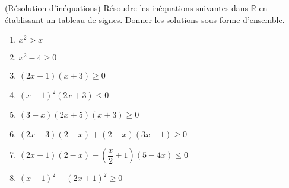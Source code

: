 \documentclass[12pt,
addpoints,
answers,
fleqn
]{exam}
\begin{document}
\begin{questions}
\begin{solution}
\begin{parts}
            \part $\dfrac{4\sqrt{8}x+1}{5}> \dfrac{3\sqrt{2}}{4}x \iff \dfrac{4\sqrt{8}x}{5} - \dfrac{3\sqrt{2}x}{4} > \dfrac{-1}{5} \iff \left(\dfrac{4\times 2\sqrt{2}}{5}-\dfrac{3\sqrt{2}}{4}\right)x > \dfrac{-1}{5} \iff \left(\dfrac{32\sqrt{2}}{20}-\dfrac{15\sqrt{2}}{20}\right)x > \dfrac{-1}{5} \iff \dfrac{17\sqrt{2}}{20}x > -\dfrac{1}{5} \iff x > \dfrac{-1}{5}\times\dfrac{20}{17\sqrt{2}} \iff x > \dfrac{-4}{17\sqrt{2}}$. Alors,  $\boxed{S=]-\dfrac{-4}{17\sqrt{2}} ; +\infty[ }$.

        \end{parts}

    \end{solution}


    \question (Résolution d'inéquations) Résoudre les inéquations suivantes dans $\mathbb{R}$ en établissant un tableau de signes. Donner les solutions sous forme d'ensemble.

    \begin{multicols}{2}
        \begin{enumerate}[(1)]
            \item $x^2 > x$
            \item $x^2 - 4 \geq 0$
            \item $(2x+1)(x+3) \geq 0$
            \item $(x+1)^2(2x+3) \leq 0$
            \item $(3-x)(2x+5)(x+3) \geq 0$
            \item $(2x+3)(2-x) + (2-x)(3x-1) \geq 0$
            \item $(2x-1)(2-x)-\left(\dfrac{x}{2}+1\right)(5-4x) \leq 0$
            \item $(x-1)^2-(2x+1)^2 \geq 0$
        \end{enumerate}
    \end{multicols}

    \begin{solution}
        \begin{parts}

\end{parts}
\end{solution}
\end{questions}
\end{document}
